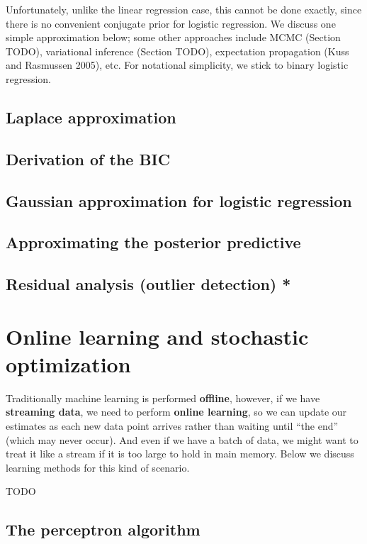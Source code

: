 Unfortunately, unlike the linear regression case, this cannot be done exactly, since there is no convenient conjugate prior for logistic regression. We discuss one simple approximation below; some other approaches include MCMC (Section TODO), variational inference (Section TODO), expectation propagation (Kuss and Rasmussen 2005), etc. For notational simplicity, we stick to binary logistic regression.


\subsection{Laplace approximation}


\subsection{Derivation of the BIC}


\subsection{Gaussian approximation for logistic regression}
\label{sec:Gaussian-approximation-for-logistic-regression}


\subsection{Approximating the posterior predictive}


\subsection{Residual analysis (outlier detection) *}


\section{Online learning and stochastic optimization}
Traditionally machine learning is performed \textbf{offline}, however, if we have \textbf{streaming data}, we need to perform \textbf{online learning}, so we can update our estimates as each new data point arrives rather than waiting until “the end” (which may never occur). And even if we have a batch of data, we might want to treat it like a stream if it is too large to hold in main memory. Below we discuss learning methods for this kind of scenario.

TODO


\subsection{The perceptron algorithm}

